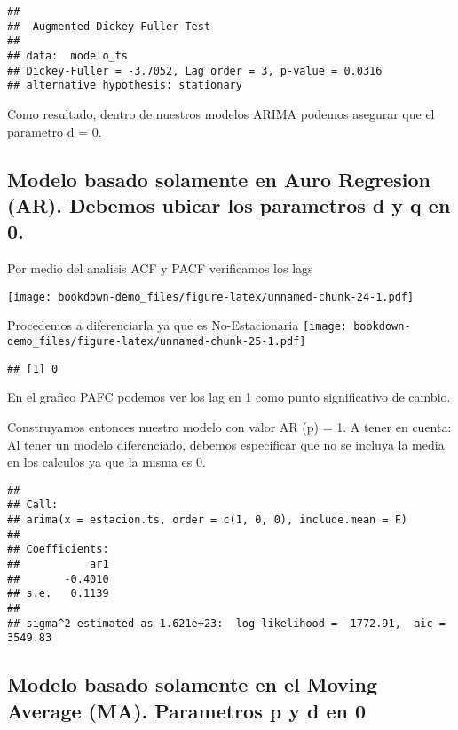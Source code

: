 \documentclass[
]{book}
\begin{document}
\begin{verbatim}
## 
##  Augmented Dickey-Fuller Test
## 
## data:  modelo_ts
## Dickey-Fuller = -3.7052, Lag order = 3, p-value = 0.0316
## alternative hypothesis: stationary
\end{verbatim}

Como resultado, dentro de nuestros modelos ARIMA podemos asegurar que el parametro d = 0.

\hypertarget{modelo-basado-solamente-en-auro-regresion-ar.-debemos-ubicar-los-parametros-d-y-q-en-0.}{%
\subsection{Modelo basado solamente en Auro Regresion (AR). Debemos ubicar los parametros d y q en 0.}\label{modelo-basado-solamente-en-auro-regresion-ar.-debemos-ubicar-los-parametros-d-y-q-en-0.}}

Por medio del analisis ACF y PACF verificamos los lags

\texttt{[image: bookdown-demo\_files/figure-latex/unnamed-chunk-24-1.pdf]}

Procedemos a diferenciarla ya que es No-Estacionaria
\texttt{[image: bookdown-demo\_files/figure-latex/unnamed-chunk-25-1.pdf]}

\begin{verbatim}
## [1] 0
\end{verbatim}

En el grafico PAFC podemos ver los lag en 1 como punto significativo de cambio.

Construyamos entonces nuestro modelo con valor AR (p) = 1. A tener en cuenta: Al tener un modelo diferenciado, debemos especificar que no se incluya la media en los calculos ya que la misma es 0.

\begin{verbatim}
## 
## Call:
## arima(x = estacion.ts, order = c(1, 0, 0), include.mean = F)
## 
## Coefficients:
##           ar1
##       -0.4010
## s.e.   0.1139
## 
## sigma^2 estimated as 1.621e+23:  log likelihood = -1772.91,  aic = 3549.83
\end{verbatim}

\hypertarget{modelo-basado-solamente-en-el-moving-average-ma.-parametros-p-y-d-en-0}{%
\subsection{Modelo basado solamente en el Moving Average (MA). Parametros p y d en 0}\label{modelo-basado-solamente-en-el-moving-average-ma.-parametros-p-y-d-en-0}}
\end{document}
